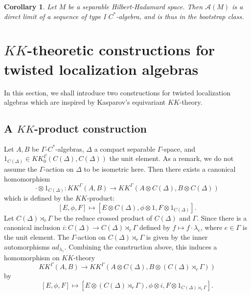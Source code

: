 \documentclass[11pt]{article}
\theoremstyle{definition}
\theoremstyle{plain}
\newtheorem{Cor}[Def]{Corollary}
\def\A{\mathcal A}\def\C{\mathcal C}\def\B{\mathcal B}\def\E{\mathcal E}\def\O{\mathcal O}\def\h{\mathfrak h}\def\K{\mathcal K}\def\F{\mathcal F}\def\P{\mathcal P}\def\L{\mathcal L}\def\R{\mathcal R}\def\Q{\mathcal Q}\def\H{\mathcal H}\def\S{\mathcal S}\def\N{\mathcal N}\def\U{\mathcal U}\def\V{\mathcal V}
\def\ox{\otimes}
\def\ox{\otimes}
\def\Ga{\Gamma}
\begin{document}
\begin{Cor}\label{AofM in Bootstrap class}
Let $M$ be a separable Hilbert-Hadamard space. Then $\A(M)$ is a direct limit of a sequence of type I $C^*$-algebra, and is thus in the bootstrap class.
\end{Cor}





























\section{$KK$-theoretic constructions for twisted localization algebras}\label{sec: KK-theoretic constructions for twisted localization algebras}

In this section, we shall introduce two constructions for twisted localization algebras which are inspired by Kasparov's equivariant $KK$-theory.

\subsection{A $KK$-product construction}\label{KK-product for localization alg}

Let $A, B$ be $\Ga$-$C^*$-algebras, $\Delta$ a compact separable $\Ga$-space, and $1_{C(\Delta)}\in KK^{\Ga}_0(C(\Delta),C(\Delta))$ the unit element. As a remark, we do not assume the $\Ga$-action on $\Delta$ to be isometric here. Then there exists a canonical homomorphism
$$\cdot\ox1_{C(\Delta)}:KK^{\Ga}(A,B)\to KK^{\Ga}(A\ox C(\Delta),B\ox C(\Delta))$$
which is defined by the $KK$-product:
$$[E,\phi,F]\mapsto [E\ox C(\Delta),\phi\ox 1,F\ox 1_{C(\Delta)}].$$
Let $C(\Delta)\rtimes_r\Ga$ be the reduce crossed product of $C(\Delta)$ and $\Ga$. Since there is a canonical inclusion $i: C(\Delta)\to C(\Delta)\rtimes_r\Ga$ defined by $f\mapsto f\cdot \lambda_e$, where $e\in\Ga$ is the unit element. The $\Ga$-action on $C(\Delta)\rtimes_r\Ga$ is given by the inner automorphisms $ad_{\lambda_\gamma}$. Combining the construction above, this induces a homomorphism on $KK$-theory
$$KK^{\Ga}(A,B)\to KK^{\Ga}(A\ox C(\Delta),B\ox(C(\Delta)\rtimes_r\Ga))$$
by
$$[E,\phi,F]\mapsto [E\ox(C(\Delta)\rtimes_r\Ga),\phi\ox i,F\ox 1_{C(\Delta)\rtimes_r\Ga}].$$
\end{document}
